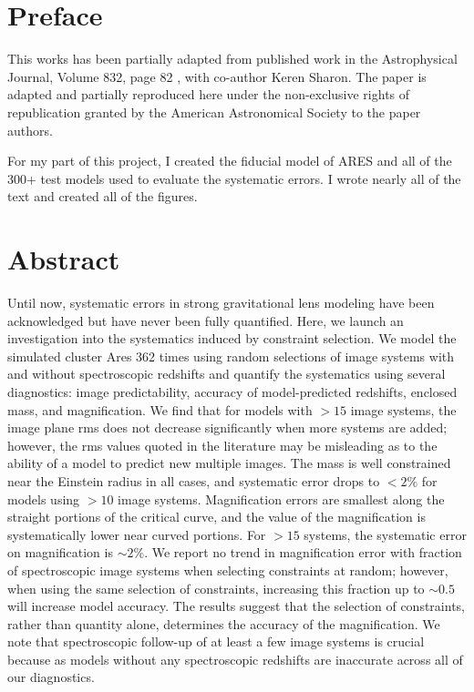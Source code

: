 \section{Preface}

This works has been partially adapted from published work in the Astrophysical Journal, Volume 832, page 82 \citep{Johnson:2016rt}, with co-author Keren Sharon. The paper is adapted and partially reproduced here under the non-exclusive rights of republication granted by the American Astronomical Society to the paper authors.

For my part of this project, I created the fiducial model of ARES and all of the 300+ test models used to evaluate the systematic errors. I wrote nearly all of the text and created all of the figures.

\section{Abstract}
Until now, systematic errors in strong gravitational lens modeling have been acknowledged but have never been fully quantified. Here, we launch an investigation into  the systematics induced by constraint selection. We model the simulated cluster Ares 362 times using random selections of image systems with and without spectroscopic redshifts and quantify the systematics using several diagnostics: image predictability, accuracy of model-predicted redshifts, enclosed mass, and magnification. We find that for models with $>15$ image systems, the image plane rms does not decrease significantly when more systems are added; however, the rms values quoted in the literature may be misleading as to the ability of a model to predict new multiple images. The mass is well constrained near the Einstein radius in all cases, and systematic error drops to $<2\%$ for models using $>10$ image systems. Magnification errors are smallest along the straight portions of the critical curve, and the value of the magnification is systematically lower near curved portions. For $>15$ systems, the systematic error on magnification is $\sim2\%$. We report no trend in magnification error with fraction of spectroscopic image systems when selecting constraints at random; however, when using the same selection of constraints, increasing this fraction up to $\sim0.5$ will increase model accuracy. The results suggest that the selection of constraints, rather than quantity alone, determines the accuracy of the magnification. We note that spectroscopic follow-up of at least a few image systems is crucial because as models without any spectroscopic redshifts are inaccurate across all of our diagnostics.

